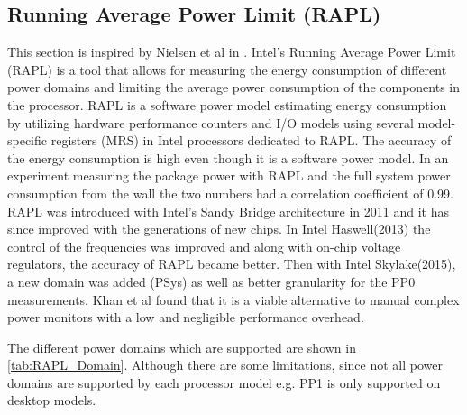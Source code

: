 \subsection{Running Average Power Limit (RAPL)}\label{subsec:rapl}
This section is inspired by Nielsen et al in \cite{Doom2021}.
Intel's Running Average Power Limit (RAPL) is a tool that allows for measuring the energy consumption of different power domains and limiting the average power consumption of the components in the processor. RAPL is a software power model estimating energy consumption by utilizing hardware performance counters and I/O models using several model-specific registers (MRS) in Intel processors dedicated to RAPL.\cite{Power-Management_Sandy_Bridge,Zhang2021} The accuracy of the energy consumption is high even though it is a software power model\cite{RAPL_ACU1,RAPL_ACU2}. In an experiment measuring the package power with RAPL and the full system power consumption from the wall the two numbers had a correlation coefficient of 0.99.\cite{RAPL_in_action} RAPL was introduced with Intel's Sandy Bridge architecture in 2011 and it has since improved with the generations of new chips. In Intel Haswell(2013) the control of the frequencies was improved and along with on-chip voltage regulators, the accuracy of RAPL became better. Then with Intel Skylake(2015), a new domain was added (PSys) as well as better granularity for the PP0 measurements. Khan et al found that it is a viable alternative to manual complex power monitors with a low and negligible performance overhead. \cite{RAPL_in_action}

The different power domains which are supported are shown in \cref{tab:RAPL_Domain}. Although there are some limitations, since not all power domains are supported by each processor model e.g. PP1 is only supported on desktop models.

